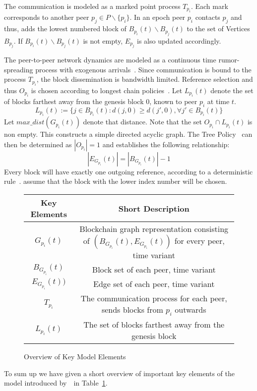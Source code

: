 The communication is modeled as a marked point process $T_{p_i}$.
Each mark corresponds to another peer $p_j \in P\backslash \{p_i\}$.
In an epoch peer $p_i$ contacts $p_j$ and thus, adds the lowest numbered block of $B_{p_i}(t)\backslash B_{p_j}(t)$ to the set of Vertices $B_{p_j}$. If $B_{p_i}(t)\backslash B_{p_j}(t)$ is not empty, $E_{p_j}$ is also updated accordingly.

The peer-to-peer network dynamics are modeled as a continuous time rumor-spreading process with exogenous arrivals~\citep{gopalan}. Since communication is bound to the process $T_{p_i}$, the block dissemination is bandwidth limited.
Reference selection and thus $O_{p_i}$ is chosen according to longest chain policies~\citep{gopalan}.
Let $L_{p_i}(t)$ denote the set of blocks farthest away from the genesis block $0$, known to peer $p_i$ at time $t$.
\begin{equation}
L_{p_i}(t) := \{j \in B_{p_i}(t): d(j,0)\geq d(j',0), \forall j' \in B_{p_i}(t) \}
\label{policy}
\end{equation}
Let $max\_ dist(G_{p_i}(t))$ denote that distance.
Note that the set $O_{p_i} \cap L_{p_i}(t)$ is non empty. This constructs a simple directed acyclic graph. The Tree Policy~\citep{gopalan} can then be determined as $|O_{p_i}|=1$ and establishes the following relationship:
\begin{equation}
|E_{G_{p_i}}(t)| = |B_{G_{p_i}}(t)| -1
\end{equation}
Every block will have exactly one outgoing reference, according to a deterministic rule~\citep{gopalan}. \citeauthor{gopalan} assume that the block with the lower index number will be chosen.

\begin{figure}[t]
\centering
{\renewcommand{\arraystretch}{1.5}
	\begin{tabular}{|c|c|}
	\hline
	\textbf{Key Elements}		&\textbf{Short Description}\\
	\hline
	$G_{p_i}(t)$				& \footnotesize Blockchain graph representation consisting of $(B_{G_{p_i}}(t),E_{G_{p_i}}(t))$ for every peer, time variant\\
	$B_{G_{p_i}}(t)$			& \footnotesize Block set of each peer, time variant\\
	$E_{G_{p_i}}(t))$			& \footnotesize Edge set of each peer, time variant \\
	$T_{p_i}$					& \footnotesize The communication process for each peer, sends blocks from $p_i$ outwards\\
	$L_{p_i}(t)$				& \footnotesize The set of blocks farthest away from the genesis block\\
	\hline
	\end{tabular}
}
\caption{Overview of Key Model Elements}
\label{OverviewElements}
\end{figure}
To sum up we have given a short overview of important key elements of the model introduced by~~in Table~\ref{OverviewElements}.

